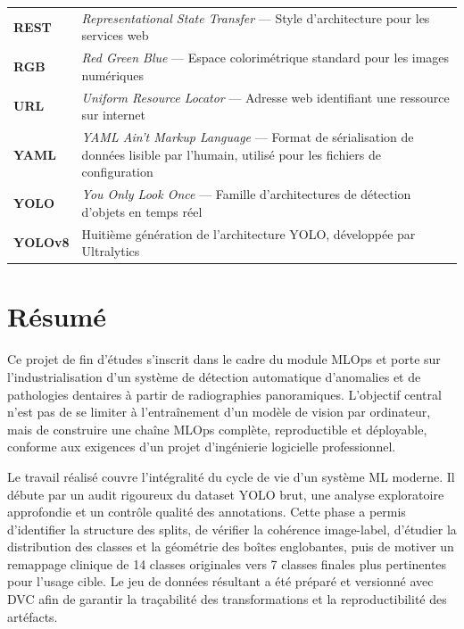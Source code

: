 \documentclass{rapportENSIAS}
\begin{document}
\begin{table}[H]
\begin{tabular}{p{3.5cm} p{11cm}}
\textbf{REST}     & \textit{Representational State Transfer} --- Style d'architecture pour les services web \\
\textbf{RGB}      & \textit{Red Green Blue} --- Espace colorimétrique standard pour les images numériques \\
\textbf{URL}      & \textit{Uniform Resource Locator} --- Adresse web identifiant une ressource sur internet \\
\textbf{YAML}     & \textit{YAML Ain't Markup Language} --- Format de sérialisation de données lisible par l'humain, utilisé pour les fichiers de configuration \\
\textbf{YOLO}     & \textit{You Only Look Once} --- Famille d'architectures de détection d'objets en temps réel \\
\textbf{YOLOv8}   & Huitième génération de l'architecture YOLO, développée par Ultralytics \\
\bottomrule
\end{tabular}
\end{table}

\newpage



\chapter*{Résumé}

Ce projet de fin d'études s'inscrit dans le cadre du module MLOps et porte sur l'industrialisation d'un système de détection automatique d'anomalies et de pathologies dentaires à partir de radiographies panoramiques. L'objectif central n'est pas de se limiter à l'entraînement d'un modèle de vision par ordinateur, mais de construire une chaîne MLOps complète, reproductible et déployable, conforme aux exigences d'un projet d'ingénierie logicielle professionnel.

Le travail réalisé couvre l'intégralité du cycle de vie d'un système ML moderne. Il débute par un audit rigoureux du dataset YOLO brut, une analyse exploratoire approfondie et un contrôle qualité des annotations. Cette phase a permis d'identifier la structure des splits, de vérifier la cohérence image-label, d'étudier la distribution des classes et la géométrie des boîtes englobantes, puis de motiver un remappage clinique de 14 classes originales vers 7 classes finales plus pertinentes pour l'usage cible. Le jeu de données résultant a été préparé et versionné avec DVC afin de garantir la traçabilité des transformations et la reproductibilité des artéfacts.
\end{document}
